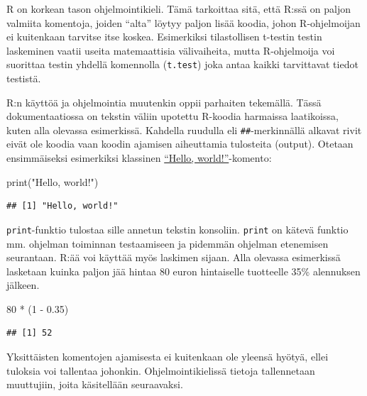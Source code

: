 \documentclass[
]{book}
\newenvironment{Shaded}{\begin{snugshade}}{\end{snugshade}}
\newcommand{\DecValTok}[1]{\textcolor[rgb]{0.00,0.00,0.81}{#1}}
\newcommand{\FloatTok}[1]{\textcolor[rgb]{0.00,0.00,0.81}{#1}}
\newcommand{\FunctionTok}[1]{\textcolor[rgb]{0.00,0.00,0.00}{#1}}
\newcommand{\NormalTok}[1]{#1}
\newcommand{\SpecialCharTok}[1]{\textcolor[rgb]{0.00,0.00,0.00}{#1}}
\newcommand{\StringTok}[1]{\textcolor[rgb]{0.31,0.60,0.02}{#1}}
\begin{document}
R on korkean tason ohjelmointikieli. Tämä tarkoittaa sitä, että R:ssä on paljon valmiita komentoja, joiden ``alta'' löytyy paljon lisää koodia, johon R-ohjelmoijan ei kuitenkaan tarvitse itse koskea. Esimerkiksi tilastollisen t-testin testin laskeminen vaatii useita matemaattisia välivaiheita, mutta R-ohjelmoija voi suorittaa testin yhdellä komennolla (\texttt{t.test}) joka antaa kaikki tarvittavat tiedot testistä.

R:n käyttöä ja ohjelmointia muutenkin oppii parhaiten tekemällä. Tässä dokumentaatiossa on tekstin väliin upotettu R-koodia harmaissa laatikoissa, kuten alla olevassa esimerkissä. Kahdella ruudulla eli \texttt{\#\#}-merkinnällä alkavat rivit eivät ole koodia vaan koodin ajamisen aiheuttamia tulosteita (output). Otetaan ensimmäiseksi esimerkiksi klassinen \href{https://en.wikipedia.org/wiki/\%22Hello,_World!\%22_program}{``Hello, world!''}-komento:

\begin{Shaded}
\begin{Highlighting}[]
\FunctionTok{print}\NormalTok{(}\StringTok{"Hello, world!"}\NormalTok{)}
\end{Highlighting}
\end{Shaded}

\begin{verbatim}
## [1] "Hello, world!"
\end{verbatim}

\texttt{print}-funktio tulostaa sille annetun tekstin konsoliin. \texttt{print} on kätevä funktio mm. ohjelman toiminnan testaamiseen ja pidemmän ohjelman etenemisen seurantaan. R:ää voi käyttää myös laskimen sijaan. Alla olevassa esimerkissä lasketaan kuinka paljon jää hintaa 80 euron hintaiselle tuotteelle 35\% alennuksen jälkeen.

\begin{Shaded}
\begin{Highlighting}[]
\DecValTok{80} \SpecialCharTok{*}\NormalTok{ (}\DecValTok{1} \SpecialCharTok{{-}} \FloatTok{0.35}\NormalTok{)}
\end{Highlighting}
\end{Shaded}

\begin{verbatim}
## [1] 52
\end{verbatim}

Yksittäisten komentojen ajamisesta ei kuitenkaan ole yleensä hyötyä, ellei tuloksia voi tallentaa johonkin. Ohjelmointikielissä tietoja tallennetaan muuttujiin, joita käsitellään seuraavaksi.
\end{document}
